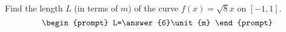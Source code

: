 \documentclass{ximera}
\author{Gregory Hartman \and Matthew Carr}
\begin{document}
\begin{exercise}





Find the length $L$ (in terms of $\unit{m}$) of the curve $f(x)=\sqrt{8}x$ on $[-1,1]$. 
\[
\begin{prompt}
L=\answer{6}\unit{m}
\end{prompt}
\]




\end{exercise}
\end{document}
